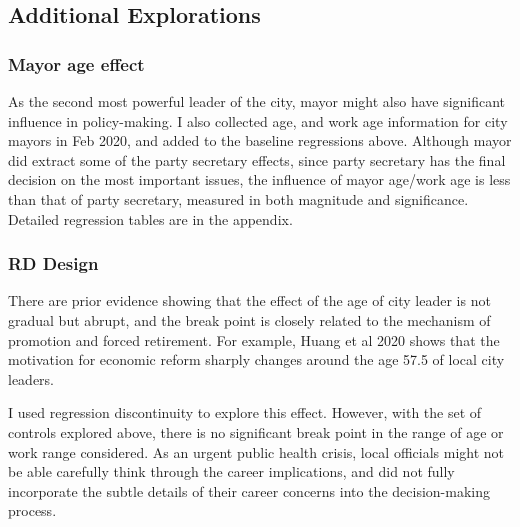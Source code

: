 \documentclass{article}
\begin{document}
\begin{CJK}{UTF8}{gbsn}
%

\subsection{Additional Explorations} 

\subsubsection{Mayor age effect}

As the second most powerful leader of the city, mayor might also have significant influence in policy-making. I also collected age, and work age information for city mayors in Feb 2020, and added to the baseline regressions above. Although mayor did extract some of the party secretary effects, since party secretary has the final decision on the most important issues, the influence of mayor age/work age is less than that of party secretary, measured in both magnitude and significance. Detailed regression tables are in the appendix.


\subsubsection{RD Design}

There are prior evidence showing that the effect of the age of city leader is not gradual but abrupt, and the break point is closely related to the mechanism of promotion and forced retirement. For example, Huang et al 2020 shows that the motivation for economic reform sharply changes around the age 57.5 of local city leaders. 

I used regression discontinuity to explore this effect. However, with the set of controls explored above, there is no significant break point in the range of age or work range considered. As an urgent public health crisis, local officials might not be able carefully think through the career implications, and did not fully incorporate the subtle details of their career concerns into the decision-making process. 

%
%
%





\end{CJK}
\end{document}
